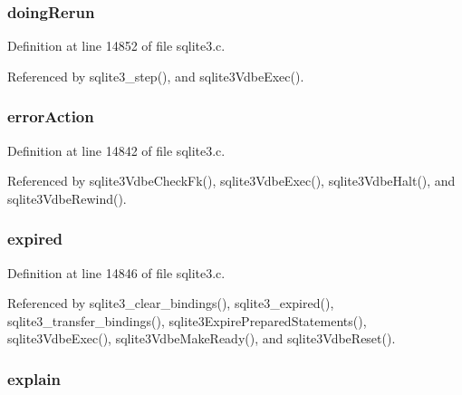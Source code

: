 \hypertarget{struct_vdbe_a8f24f569f193f29e92ff1a3528763db2}{}
\subsubsection[{doing\+Rerun}]{ doing\+Rerun}\label{struct_vdbe_a8f24f569f193f29e92ff1a3528763db2}


Definition at line 14852 of file sqlite3.\+c.



Referenced by sqlite3\+\_\+step(), and sqlite3\+Vdbe\+Exec().

\hypertarget{struct_vdbe_abea7304ec108b435df4b4399b88977cb}{}
\subsubsection[{error\+Action}]{ error\+Action}\label{struct_vdbe_abea7304ec108b435df4b4399b88977cb}


Definition at line 14842 of file sqlite3.\+c.



Referenced by sqlite3\+Vdbe\+Check\+Fk(), sqlite3\+Vdbe\+Exec(), sqlite3\+Vdbe\+Halt(), and sqlite3\+Vdbe\+Rewind().

\hypertarget{struct_vdbe_afe22cf7807da6858c969eb7194f00969}{}
\subsubsection[{expired}]{ expired}\label{struct_vdbe_afe22cf7807da6858c969eb7194f00969}


Definition at line 14846 of file sqlite3.\+c.



Referenced by sqlite3\+\_\+clear\+\_\+bindings(), sqlite3\+\_\+expired(), sqlite3\+\_\+transfer\+\_\+bindings(), sqlite3\+Expire\+Prepared\+Statements(), sqlite3\+Vdbe\+Exec(), sqlite3\+Vdbe\+Make\+Ready(), and sqlite3\+Vdbe\+Reset().

\hypertarget{struct_vdbe_a9d0e7c3b8a77896616381d6c108551e6}{}
\subsubsection[{explain}]{ explain}\label{struct_vdbe_a9d0e7c3b8a77896616381d6c108551e6}


